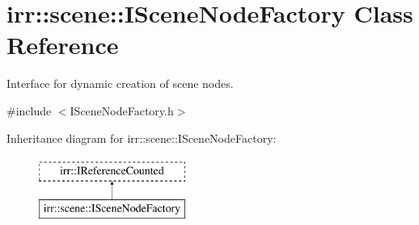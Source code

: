 \hypertarget{classirr_1_1scene_1_1ISceneNodeFactory}{}\section{irr\+:\+:scene\+:\+:I\+Scene\+Node\+Factory Class Reference}
\label{classirr_1_1scene_1_1ISceneNodeFactory}


Interface for dynamic creation of scene nodes.  




{\ttfamily \#include $<$I\+Scene\+Node\+Factory.\+h$>$}

Inheritance diagram for irr\+:\+:scene\+:\+:I\+Scene\+Node\+Factory\+:\begin{figure}[H]
\begin{center}
\leavevmode
\includegraphics[height=2.000000cm]{classirr_1_1scene_1_1ISceneNodeFactory}
\end{center}
\end{figure}

